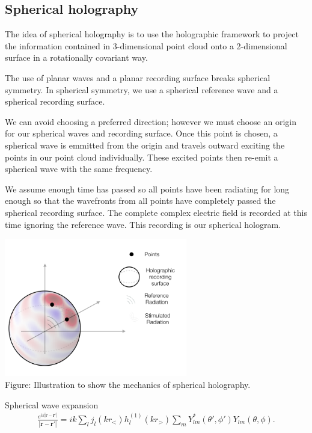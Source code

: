 \documentclass{article}
\begin{document}
\subsection{Spherical holography}

The idea of spherical holography is to use the holographic framework to project the information contained in 3-dimensional point cloud onto a 2-dimensional surface in a rotationally covariant way. 

The use of planar waves and a planar recording surface breaks spherical symmetry. In spherical symmetry, we use a spherical reference wave and a spherical recording surface.

We can avoid choosing a preferred direction; however we must choose an origin for our spherical waves and recording surface. Once this point is chosen, a spherical wave is emmitted from the origin and travels outward exciting the points in our point cloud individually. These excited points then re-emit a spherical wave with the same frequency. 

We assume enough time has passed so all points have been radiating for long enough so that the wavefronts from all points have completely passed the spherical recording surface. The complete complex electric field is recorded at this time ignoring the reference wave. This recording is our spherical hologram.

\begin{center}
\includegraphics[width=8cm]{hologram_example}\\
Figure: Illustration to show the mechanics of spherical holography. 
\end{center}
Spherical wave expansion 
\begin{align}
    \frac{e^{ik|\textbf{r}-\textbf{r}'|}}{|\textbf{r}-\textbf{r}'|} = ik\sum_lj_l(kr_<)h_l^{(1)}(kr_>)\sum_m Y^*_{lm}(\theta',\phi')Y_{lm}(\theta,\phi).
\end{align}
\end{document}
